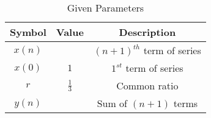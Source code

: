 \begin{table}[!h]
    \centering
    \begin{tabular}{|c|c|c|}
    \hline
       \textbf{Symbol}  & \textbf{Value} & \textbf{Description}\\
    \hline
        $x(n)$ &  & $(n+1)^{th}$ term of series\\
    \hline
        $x(0)$ & $1$ & $1^{st}$ term of series\\
    \hline
        $r$ & $\frac{1}{3}$ & Common ratio\\
    \hline
        $y(n)$ & & Sum of $(n+1)$ terms\\
    \hline
     \end{tabular}
    \caption{Given Parameters}
    \label{tab:1_gate.21.bt.20}
\end{table}
